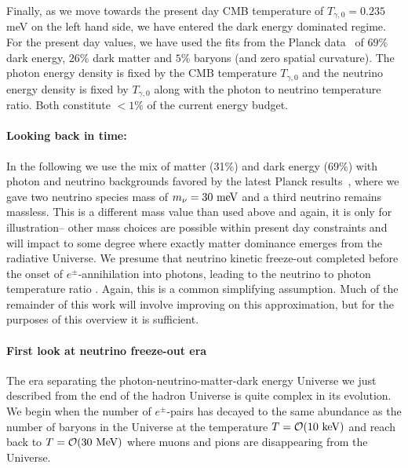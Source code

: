 {Finally, as we move towards the present day CMB temperature of $T_{\gamma,0}=0.235$ meV on the left hand side, we have entered the dark energy dominated regime. For the present day values, we have used the fits from the Planck data~\cite{Planck:2018vyg,Planck:2015fie,Planck:2013pxb} of $69\%$ dark energy, $26\%$ dark matter and $5\%$ baryons (and zero spatial curvature). The photon energy density is fixed by the CMB temperature $T_{\gamma,0}$ and the neutrino energy density is fixed by $T_{\gamma,0}$ along with the photon to neutrino temperature ratio. Both constitute $<1\%$ of the current energy budget.

\paragraph{Looking back in time:}
In the following we use the mix of matter (31\%) and dark energy (69\%) with photon and neutrino backgrounds favored by the latest Planck results~\cite{Planck:2018vyg,Planck:2015fie,Planck:2013pxb}, where we gave two neutrino species mass of $m_\nu=30\text{ meV}$ and a third neutrino remains massless. This is a different mass value than used above and again, it is only for illustration-- other mass choices are possible within present day constraints and will impact to some degree where exactly matter dominance emerges from the radiative Universe. We presume that neutrino kinetic freeze-out completed before the onset of $e^\pm$-annihilation into photons, leading to the neutrino to photon temperature ratio . Again, this is a common simplifying assumption. Much of the remainder of this work will involve improving on this approximation, but for the purposes of this overview it is sufficient.

\paragraph{First look at neutrino freeze-out era} 
The era separating the photon-neutrino-matter-dark energy Universe we just described from the end of the hadron Universe is quite complex in its evolution. We begin when the number of $e^\pm$-pairs has decayed to the same abundance as the number of baryons in the Universe at the temperature $T=\mathcal{O}(10\text{ keV})$ and reach back to $T={\cal O}(30\MeV)$ where muons and pions are disappearing from the Universe.

}
